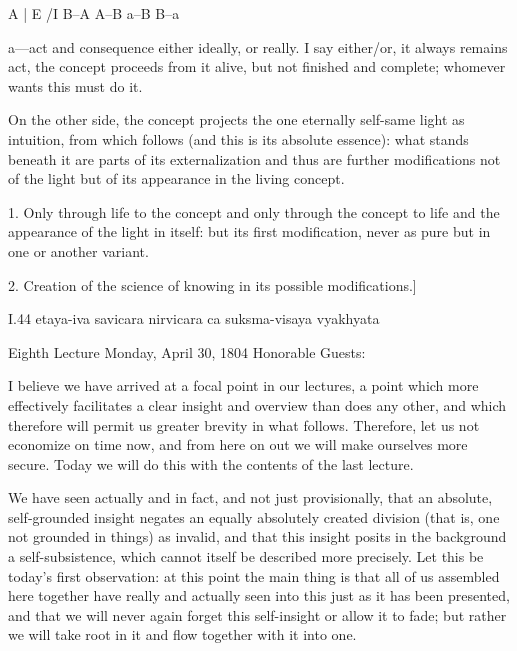 A | E /I B–A A–B \R a–B B–a

a—act and consequence either ideally, or really.
I say either/or, it always remains act,
the concept proceeds from it alive,
but not finished and complete;
whomever wants this must do it.

On the other side, the concept projects
the one eternally self-same light as intuition,
from which follows (and this is its absolute essence):
what stands beneath it are parts of its externalization
and thus are further modifications not of the light
but of its appearance in the living concept.

1. Only through life to the concept
and only through the concept to life
and the appearance of the light in itself:
but its first modification, never as pure
but in one or another variant.

2. Creation of the science of knowing
in its possible modifications.]

I.44
etaya-iva savicara nirvicara ca suksma-visaya vyakhyata

Eighth Lecture
Monday, April 30, 1804
Honorable Guests:

I believe we have arrived at a focal point in our lectures,
a point which more effectively facilitates
a clear insight and overview than does any other,
and which therefore will permit us greater brevity in what follows.
Therefore, let us not economize on time now,
and from here on out we will make ourselves more secure.
Today we will do this with the contents of the last lecture.

We have seen actually and in fact,
and not just provisionally,
that an absolute, self-grounded insight negates
an equally absolutely created division
(that is, one not grounded in things)
as invalid, and that this insight posits
in the background a self-subsistence,
which cannot itself be described more precisely.
Let this be today's first observation:
at this point the main thing is that
all of us assembled here together have
really and actually seen into this
just as it has been presented,
and that we will never again forget this
self-insight or allow it to fade;
but rather we will take root in it
and flow together with it into one.

